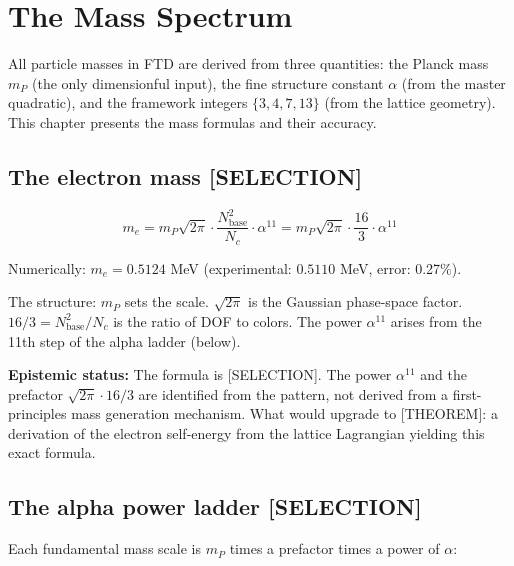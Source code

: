 \documentclass[
  11pt,
  letterpaper,
  twoside,
  openany]{book}
\makeatletter
\let\orig@section\section
\renewcommand{\section}{\needspace{8\baselineskip}\orig@section}
\makeatother
\begin{document}
\chapter{The Mass Spectrum}\label{sec-masses}

All particle masses in FTD are derived from three quantities: the Planck
mass \(m_P\) (the only dimensionful input), the fine structure constant
\(\alpha\) (from the master quadratic), and the framework integers
\(\{3, 4, 7, 13\}\) (from the lattice geometry). This chapter presents
the mass formulas and their accuracy.

\section{The electron mass
{[}SELECTION{]}}\label{the-electron-mass-selection}

\[
m_e = m_P \sqrt{2\pi} \cdot \frac{N_{\text{base}}^2}{N_c} \cdot \alpha^{11} = m_P \sqrt{2\pi} \cdot \frac{16}{3} \cdot \alpha^{11}
\tag{12.1}
\]

Numerically: \(m_e = 0.5124\) MeV (experimental: \(0.5110\) MeV, error:
0.27\%).

The structure: \(m_P\) sets the scale. \(\sqrt{2\pi}\) is the Gaussian
phase-space factor. \(16/3 = N_{\text{base}}^2/N_c\) is the ratio of DOF
to colors. The power \(\alpha^{11}\) arises from the 11th step of the
alpha ladder (below).

\textbf{Epistemic status:} The formula is {[}SELECTION{]}. The power
\(\alpha^{11}\) and the prefactor \(\sqrt{2\pi} \cdot 16/3\) are
identified from the pattern, not derived from a first-principles mass
generation mechanism. What would upgrade to {[}THEOREM{]}: a derivation
of the electron self-energy from the lattice Lagrangian yielding this
exact formula.

\section{The alpha power ladder
{[}SELECTION{]}}\label{the-alpha-power-ladder-selection}

Each fundamental mass scale is \(m_P\) times a prefactor times a power
of \(\alpha\):
\end{document}

